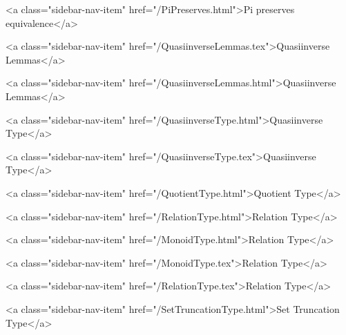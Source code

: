           <a class="sidebar-nav-item" href="/PiPreserves.html">Pi preserves equivalence</a>
        
      
    
      
        
          <a class="sidebar-nav-item" href="/QuasiinverseLemmas.tex">Quasiinverse Lemmas</a>
        
      
    
      
        
          <a class="sidebar-nav-item" href="/QuasiinverseLemmas.html">Quasiinverse Lemmas</a>
        
      
    
      
        
          <a class="sidebar-nav-item" href="/QuasiinverseType.html">Quasiinverse Type</a>
        
      
    
      
        
          <a class="sidebar-nav-item" href="/QuasiinverseType.tex">Quasiinverse Type</a>
        
      
    
      
        
          <a class="sidebar-nav-item" href="/QuotientType.html">Quotient Type</a>
        
      
    
      
        
          <a class="sidebar-nav-item" href="/RelationType.html">Relation Type</a>
        
      
    
      
        
          <a class="sidebar-nav-item" href="/MonoidType.html">Relation Type</a>
        
      
    
      
        
          <a class="sidebar-nav-item" href="/MonoidType.tex">Relation Type</a>
        
      
    
      
        
          <a class="sidebar-nav-item" href="/RelationType.tex">Relation Type</a>
        
      
    
      
        
          <a class="sidebar-nav-item" href="/SetTruncationType.html">Set Truncation Type</a>
        
      
    

